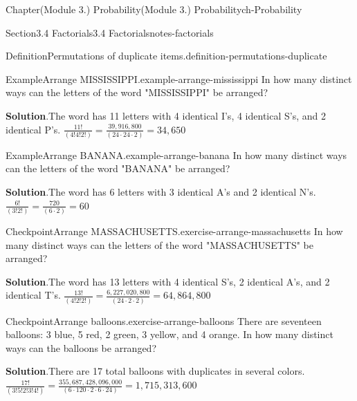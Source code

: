 \documentclass[oneside,10pt,]{book}
\newcommand{\blocktitlefont}{\relax}
\begin{document}
\begin{chapterptx}{Chapter}{(Module 3.) Probability}{}{(Module 3.) Probability}{}{}{ch-Probability}
\begin{sectionptx}{Section}{3.4 Factorials}{}{3.4 Factorials}{}{}{notes-factorials}
\begin{definition}{Definition}{Permutations of duplicate items.}{definition-permutations-duplicate}
\begin{equation*}
\end{equation*}
\end{definition}
\begin{example}{Example}{Arrange MISSISSIPPI.}{example-arrange-mississippi}%
In how many distinct ways can the letters of the word "MISSISSIPPI" be arranged?%
\par\smallskip%
\noindent\textbf{\blocktitlefont Solution}.\hypertarget{example-arrange-mississippi-3}{}\quad{}The word has 11 letters with 4 identical I's, 4 identical S's, and 2 identical P's.%
\(\frac{11!}{(4! 4! 2!)} = \frac{39,916,800}{(24 \cdot 24 \cdot 2)} = 34,650\)\end{example}
\begin{example}{Example}{Arrange BANANA.}{example-arrange-banana}%
In how many distinct ways can the letters of the word "BANANA" be arranged?%
\par\smallskip%
\noindent\textbf{\blocktitlefont Solution}.\hypertarget{example-arrange-banana-3}{}\quad{}The word has 6 letters with 3 identical A's and 2 identical N's.%
\(\frac{6!}{(3! 2!)} = \frac{720}{(6 \cdot 2)} = 60\)\end{example}
\begin{inlineexercise}{Checkpoint}{Arrange MASSACHUSETTS.}{exercise-arrange-massachusetts}%
In how many distinct ways can the letters of the word "MASSACHUSETTS" be arranged?%
\par\smallskip%
\noindent\textbf{\blocktitlefont Solution}.\hypertarget{exercise-arrange-massachusetts-3}{}\quad{}The word has 13 letters with 4 identical S's, 2 identical A's, and 2 identical T's.%
\(\frac{13!}{(4! 2! 2!)} = \frac{6,227,020,800}{(24 \cdot 2 \cdot 2)} = 64,864,800\)\end{inlineexercise}%
\begin{inlineexercise}{Checkpoint}{Arrange balloons.}{exercise-arrange-balloons}%
There are seventeen balloons: 3 blue, 5 red, 2 green, 3 yellow, and 4 orange. In how many distinct ways can the balloons be arranged?%
\par\smallskip%
\noindent\textbf{\blocktitlefont Solution}.\hypertarget{exercise-arrange-balloons-3}{}\quad{}There are 17 total balloons with duplicates in several colors.%
\(\frac{17!}{(3! 5! 2! 3! 4!)} = \frac{355,687,428,096,000}{(6 \cdot 120 \cdot 2 \cdot 6 \cdot 24)} = 1,715,313,600\)\end{inlineexercise}%
\end{sectionptx}
%
%
\typeout{************************************************}
\typeout{************************************************}

\end{chapterptx}
\end{document}
